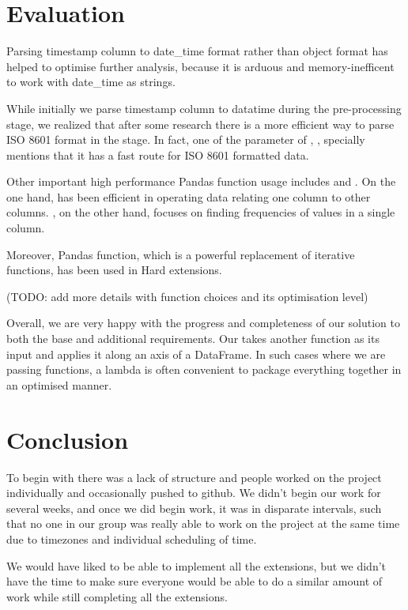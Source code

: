 \documentclass[12pt,a4paper,final]{article}
\begin{document}
\section*{Evaluation}
Parsing timestamp column to date\_time format rather than object format has helped to optimise further analysis, because it is arduous and memory-inefficent to work with date\_time as strings.

While initially we parse timestamp column to datatime during the pre-processing stage, we realized that after some research there is a more efficient way to parse ISO 8601 format in the  stage.
In fact, one of the parameter of , , specially mentions that it has a fast route for ISO 8601 formatted data.

Other important high performance Pandas function usage includes  and . On the one hand,  has been efficient in operating data relating one column to other columns.
, on the other hand, focuses on finding frequencies of values in a single column.

Moreover, Pandas  function, which is a powerful replacement of iterative functions, has been used in Hard extensions.

(TODO: add more details with function choices and its optimisation level)

Overall, we are very happy with the progress and completeness of our solution to both the base and additional requirements. Our  takes another function as its input and applies it along an axis of a DataFrame.
In such cases where we are passing functions, a lambda is often convenient to package everything together in an optimised manner.

\section*{Conclusion}

To begin with there was a lack of structure and people worked on the project individually and occasionally pushed to github. We didn't begin our work for several weeks, and once we did begin work, it was in disparate intervals, such that no one in our group was really able to work on the project at the same time due to timezones and individual scheduling of time.

We would have liked to be able to implement all the extensions, but we didn't have the time to make sure everyone would be able to do a similar amount of work while still completing all the extensions.
\end{document}
